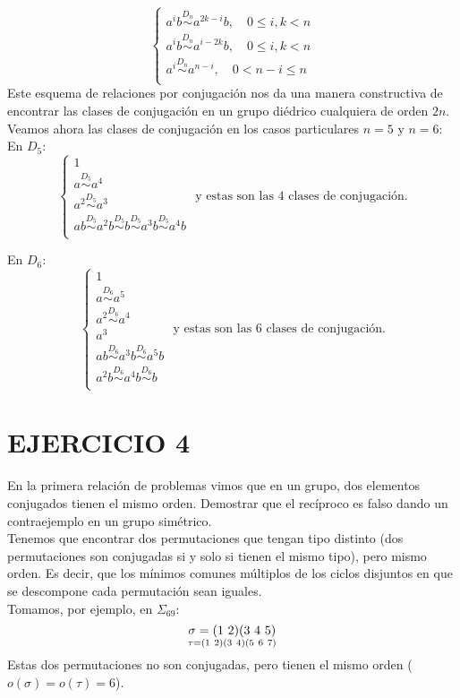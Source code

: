 \documentclass{article}
\begin{document}
$$\left\lbrace
\begin{array}{l}
  a^ib \overset{D_n}{\sim } a^{2k - i}b, \quad 0 \leqslant i, k < n\\
  a^ib \overset{D_n}{\sim } a^{i - 2k}b , \quad 0 \leqslant i, k < n\\
  a^i \overset{D_n}{\sim } a^{n - i}, \quad 0 < n - i \leqslant n\\
\end{array} \right.
$$
Este esquema de relaciones por conjugación nos da una manera constructiva de encontrar las clases de conjugación en un grupo diédrico cualquiera de orden $2n$. Veamos ahora las clases de conjugación en los casos particulares $n = 5$ y $n = 6$:\\
En $D_5$:\\
$$
\left\lbrace
\begin{array}{l}
  1 \\
  a \overset{D_5}{\sim} a^4 \\
  a^2 \overset{D_5}{\sim} a^3 \\
  ab \overset{D_5}{\sim} a^2b \overset{D_5}{\sim} b \overset{D_5}{\sim} a^3b \overset{D_5}{\sim} a^4b \\
\end{array} \right. \text{ y estas son las 4 clases de conjugación.}
$$

En $D_6$:\\
$$
\left\lbrace
\begin{array}{l}
  1 \\
  a \overset{D_6}{\sim} a^5 \\
  a^2 \overset{D_6}{\sim} a^4 \\
  a^3 \\
  ab \overset{D_6}{\sim} a^3b \overset{D_6}{\sim} a^5b \\
  a^2b \overset{D_6}{\sim} a^4b \overset{D_6}{\sim} b \\
\end{array} \right. \text{ y estas son las 6 clases de conjugación.}
$$

\section*{EJERCICIO 4}

En la primera relación de problemas vimos que en un grupo, dos elementos conjugados tienen el mismo orden. Demostrar que el recíproco es falso dando un contraejemplo en un grupo simétrico.\\

Tenemos que encontrar dos permutaciones que tengan tipo distinto (dos permutaciones son conjugadas si y solo si tienen el mismo tipo), pero mismo orden. Es decir, que los mínimos comunes múltiplos de los ciclos disjuntos en que se descompone cada permutación sean iguales.\\
Tomamos, por ejemplo, en $\Sigma_{69}$:
$$
\sigma = (1 \ 2)(3 \ 4 \ 5) \atop
\tau = (1 \ 2)(3 \ 4)(5 \ 6 \ 7)
$$
Estas dos permutaciones no son conjugadas, pero tienen el mismo orden ($o(\sigma) = o(\tau) = 6$).
\end{document}
